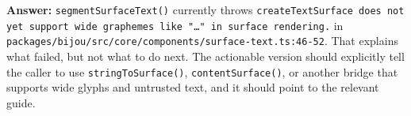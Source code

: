 \textbf{Answer:} \texttt{s\allowbreak{}e\allowbreak{}g\allowbreak{}m\allowbreak{}e\allowbreak{}n\allowbreak{}t\allowbreak{}S\allowbreak{}u\allowbreak{}r\allowbreak{}f\allowbreak{}a\allowbreak{}c\allowbreak{}e\allowbreak{}T\allowbreak{}e\allowbreak{}x\allowbreak{}t\allowbreak{}(\allowbreak{})} currently throws \texttt{c\allowbreak{}r\allowbreak{}e\allowbreak{}a\allowbreak{}t\allowbreak{}e\allowbreak{}T\allowbreak{}e\allowbreak{}x\allowbreak{}t\allowbreak{}S\allowbreak{}u\allowbreak{}r\allowbreak{}f\allowbreak{}a\allowbreak{}c\allowbreak{}e\allowbreak{} \allowbreak{}d\allowbreak{}o\allowbreak{}e\allowbreak{}s\allowbreak{} \allowbreak{}n\allowbreak{}o\allowbreak{}t\allowbreak{} \allowbreak{}y\allowbreak{}e\allowbreak{}t\allowbreak{} \allowbreak{}s\allowbreak{}u\allowbreak{}p\allowbreak{}p\allowbreak{}o\allowbreak{}r\allowbreak{}t\allowbreak{} \allowbreak{}w\allowbreak{}i\allowbreak{}d\allowbreak{}e\allowbreak{} \allowbreak{}g\allowbreak{}r\allowbreak{}a\allowbreak{}p\allowbreak{}h\allowbreak{}e\allowbreak{}m\allowbreak{}e\allowbreak{}s\allowbreak{} \allowbreak{}l\allowbreak{}i\allowbreak{}k\allowbreak{}e\allowbreak{} \allowbreak{}"\allowbreak{}…\allowbreak{}"\allowbreak{} \allowbreak{}i\allowbreak{}n\allowbreak{} \allowbreak{}s\allowbreak{}u\allowbreak{}r\allowbreak{}f\allowbreak{}a\allowbreak{}c\allowbreak{}e\allowbreak{} \allowbreak{}r\allowbreak{}e\allowbreak{}n\allowbreak{}d\allowbreak{}e\allowbreak{}r\allowbreak{}i\allowbreak{}n\allowbreak{}g\allowbreak{}.} in \texttt{p\allowbreak{}a\allowbreak{}c\allowbreak{}k\allowbreak{}a\allowbreak{}g\allowbreak{}e\allowbreak{}s\allowbreak{}/\allowbreak{}b\allowbreak{}i\allowbreak{}j\allowbreak{}o\allowbreak{}u\allowbreak{}/\allowbreak{}s\allowbreak{}r\allowbreak{}c\allowbreak{}/\allowbreak{}c\allowbreak{}o\allowbreak{}r\allowbreak{}e\allowbreak{}/\allowbreak{}c\allowbreak{}o\allowbreak{}m\allowbreak{}p\allowbreak{}o\allowbreak{}n\allowbreak{}e\allowbreak{}n\allowbreak{}t\allowbreak{}s\allowbreak{}/\allowbreak{}s\allowbreak{}u\allowbreak{}r\allowbreak{}f\allowbreak{}a\allowbreak{}c\allowbreak{}e\allowbreak{}-\allowbreak{}t\allowbreak{}e\allowbreak{}x\allowbreak{}t\allowbreak{}.\allowbreak{}t\allowbreak{}s\allowbreak{}:\allowbreak{}4\allowbreak{}6\allowbreak{}-\allowbreak{}5\allowbreak{}2}. That explains what failed, but not what to do next. The actionable version should explicitly tell the caller to use \texttt{s\allowbreak{}t\allowbreak{}r\allowbreak{}i\allowbreak{}n\allowbreak{}g\allowbreak{}T\allowbreak{}o\allowbreak{}S\allowbreak{}u\allowbreak{}r\allowbreak{}f\allowbreak{}a\allowbreak{}c\allowbreak{}e\allowbreak{}(\allowbreak{})}, \texttt{c\allowbreak{}o\allowbreak{}n\allowbreak{}t\allowbreak{}e\allowbreak{}n\allowbreak{}t\allowbreak{}S\allowbreak{}u\allowbreak{}r\allowbreak{}f\allowbreak{}a\allowbreak{}c\allowbreak{}e\allowbreak{}(\allowbreak{})}, or another bridge that supports wide glyphs and untrusted text, and it should point to the relevant guide.

